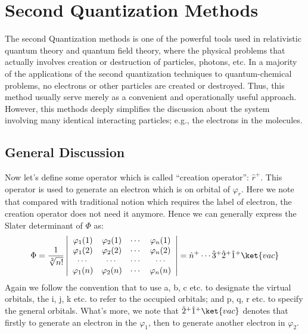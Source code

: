 %
%
%
%
\chapter{Second Quantization Methods}
%
%
%
The second Quantization methods is one of the powerful tools used in
relativistic quantum theory and quantum field theory, where the
physical problems that actually involves creation or destruction of
particles, photons, etc. In a majority of the applications of the
second quantization techniques to quantum-chemical problems, no
electrons or other particles are created or destroyed. Thus, this
method usually serve merely as a convenient and operationally useful
approach. However, this methods deeply simplifies the discussion about 
the system involving many identical interacting particles; e.g., the electrons
in the molecules.



\section{General Discussion}
%
%
%
Now let's define some operator which is called ``creation operator'':
$\hat{r}^{+}$. This operator is used to generate an electron which is on orbital
of $\varphi_{r}$. Here we note that compared with traditional notion which
requires the label of electron, the creation operator does not need it anymore.
Hence we can generally express the Slater determinant of $\Phi$ as:
\begin{equation}
 \label{second_quantization_general_discussion:1}
\Phi = \frac{1}{\sqrt[2]{n!}} \left | \begin{array}{cccc}
  \varphi_{1}(1) & \varphi_{2}(1) & \cdots & \varphi_{n}(1) \\
  \varphi_{1}(2) & \varphi_{2}(2) & \cdots & \varphi_{n}(2) \\
  \cdots & \cdots & \cdots & \cdots                        \\
  \varphi_{1}(n) & \varphi_{2}(n) & \cdots & \varphi_{n}(n)
\end{array} \right | =
\hat{n}^{+}\cdots\hat{3}^{+}\hat{2}^{+}\hat{1}^{+}\ket{vac}
\end{equation}
Again we follow the convention that to use a, b, c etc. to designate the virtual
orbitals, the i, j, k etc. to refer to the occupied orbitals; and p,
q, r etc. to specify the general orbitals. What's more, we note that
$\hat{2}^{+}\hat{1}^{+}\ket{vac}$ denotes that firstly to generate an electron
in the $\varphi_{1}$, then to generate another electron in $\varphi_{2}$. 

